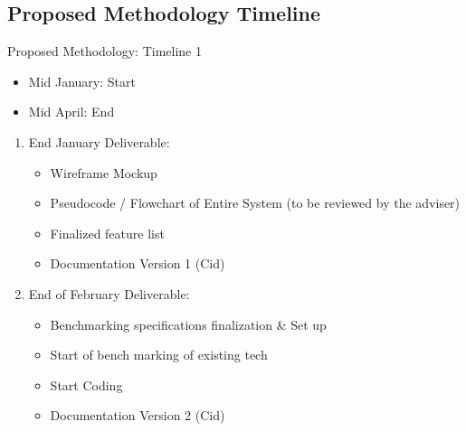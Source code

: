 \documentclass{beamer}
\begin{document}
\subsection{Proposed Methodology Timeline}
\begin{frame}{Proposed Methodology: Timeline 1}
    \begin{itemize}
        \item Mid January: Start
        \item Mid April: End
    \end{itemize}
    \begin{enumerate}
        \item End January Deliverable: 
        \begin{itemize}
            \item Wireframe Mockup
            \item Pseudocode / Flowchart of Entire System (to be reviewed by the adviser)
            \item Finalized feature list
            \item Documentation Version 1 (Cid)
        \end{itemize}
        \item End of February Deliverable:
            \begin{itemize}
                \item Benchmarking specifications finalization \& Set up
                \item Start of bench marking of existing tech
                \item Start Coding
                \item Documentation Version 2 (Cid)
            \end{itemize}
    \end{enumerate}            
            \end{frame}
\end{document}
